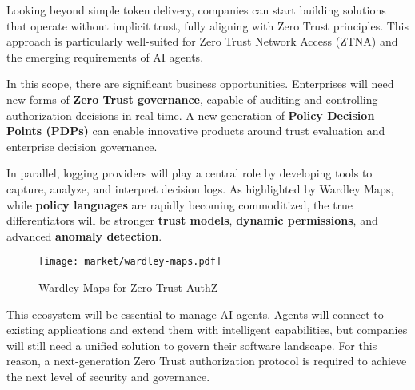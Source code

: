 Looking beyond simple token delivery, companies can start building solutions that operate without implicit trust, fully aligning with Zero Trust principles. 
This approach is particularly well-suited for Zero Trust Network Access (ZTNA) and the emerging requirements of AI agents.  

In this scope, there are significant business opportunities.  
Enterprises will need new forms of \textbf{Zero Trust governance}, capable of auditing and controlling authorization decisions in real time.  
A new generation of \textbf{Policy Decision Points (PDPs)} can enable innovative products around trust evaluation and enterprise decision governance.  

In parallel, logging providers will play a central role by developing tools to capture, analyze, and interpret decision logs.  
As highlighted by Wardley Maps, while \textbf{policy languages} are rapidly becoming commoditized, the true differentiators will be stronger \textbf{trust models}, \textbf{dynamic permissions}, and advanced \textbf{anomaly detection}.  

\begin{figure*}[htbp]
    \centering
    \texttt{[image: market/wardley-maps.pdf]}
    \caption{Wardley Maps for Zero Trust AuthZ}
    \label{fig:wardley-maps-enterprise}
\end{figure*}

This ecosystem will be essential to manage AI agents.  
Agents will connect to existing applications and extend them with intelligent capabilities, but companies will still need a unified solution to govern their software landscape.  
For this reason, a next-generation Zero Trust authorization protocol is required to achieve the next level of security and governance.


